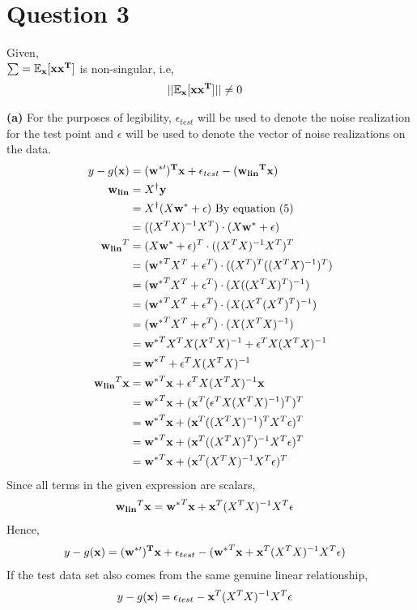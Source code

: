 \documentclass[12pt]{article}
\newcommand{\e}[0]{\epsilon}
\begin{document}
\section*{Question 3}
Given,\\
\(\sum = {\bf \mathbb{E}_x[xx^T]}\) is non-singular, i.e,
\begin{align}
    ||{\bf \mathbb{E}_x[xx^T]}|| & \neq 0
\end{align}

\textbf{(a)}
For the purposes of legibility, \(\e_{test}\) will be used to denote the noise realization for the test point and \(\e\) will be used to denote the vector of noise realizations on the data.
\begin{align} \nonumber
    y - g({\bf x}) & = {\bf (w^{*\prime})^Tx} + \e_{test} - ({\bf {w_{lin}}^Tx}) \\ \nonumber
    {\bf w_{lin}} & = X^\dagger{\bf y} \\ \nonumber
    & = X^\dagger({X}{\bf w^*} + {\bf \e}) \text{ By equation (5)} \\ \nonumber
    & = ((X^TX)^{-1}X^T)\cdot({X}{\bf w^*} + {\bf \e}) \\ \nonumber
    {\bf w_{lin}}^T & = ({X}{\bf w^*} + {\bf \e})^T\cdot((X^TX)^{-1}X^T)^T \\ \nonumber
    & = ({\bf w^*}^TX^T + {\bf \e}^T)\cdot((X^T)^T((X^TX)^{-1})^T) \\ \nonumber
    & = ({\bf w^*}^TX^T + {\bf \e}^T)\cdot(X((X^TX)^T)^{-1}) \\ \nonumber
    & = ({\bf w^*}^TX^T + {\bf \e}^T)\cdot(X(X^T(X^T)^T)^{-1}) \\ \nonumber
    & = ({\bf w^*}^TX^T + {\bf \e}^T)\cdot(X(X^TX)^{-1}) \\ \nonumber
    & = {\bf w^*}^TX^TX(X^TX)^{-1} + {\bf \e}^TX(X^TX)^{-1} \\ \nonumber
    & = {\bf w^*}^T + {\bf \e}^TX(X^TX)^{-1} \\ \nonumber
    {\bf w_{lin}}^T{\bf x} & = {\bf w^*}^T{\bf x} + {\bf \e}^TX(X^TX)^{-1}{\bf x} \\ \nonumber
    & = {\bf w^*}^T{\bf x} + ({\bf x}^T({\bf \e}^TX(X^TX)^{-1})^T)^T  \\ \nonumber
    & = {\bf w^*}^T{\bf x} + ({\bf x}^T((X^TX)^{-1})^TX^T{\bf \e})^T  \\ \nonumber
    & = {\bf w^*}^T{\bf x} + ({\bf x}^T((X^TX)^T)^{-1}X^T{\bf \e})^T  \\ \nonumber
    & = {\bf w^*}^T{\bf x} + ({\bf x}^T(X^TX)^{-1}X^T{\bf \e})^T 
\end{align}
Since all terms in the given expression are scalars,
\begin{align}
    {\bf w_{lin}}^T{\bf x} & = {\bf w^*}^T{\bf x} + {\bf x}^T(X^TX)^{-1}X^T{\bf \e}
\end{align}
Hence,
\begin{align} \nonumber
    y - g({\bf x}) & = {\bf (w^{*\prime})^Tx} + \e_{test} - ({\bf w^*}^T{\bf x} + {\bf x}^T(X^TX)^{-1}X^T{\bf \e})
\end{align}
If the test data set also comes from the same genuine linear relationship,
\begin{align} 
    y - g({\bf x}) & = \e_{test} - {\bf x}^T(X^TX)^{-1}X^T{\bf \e}
\end{align}
\end{document}
